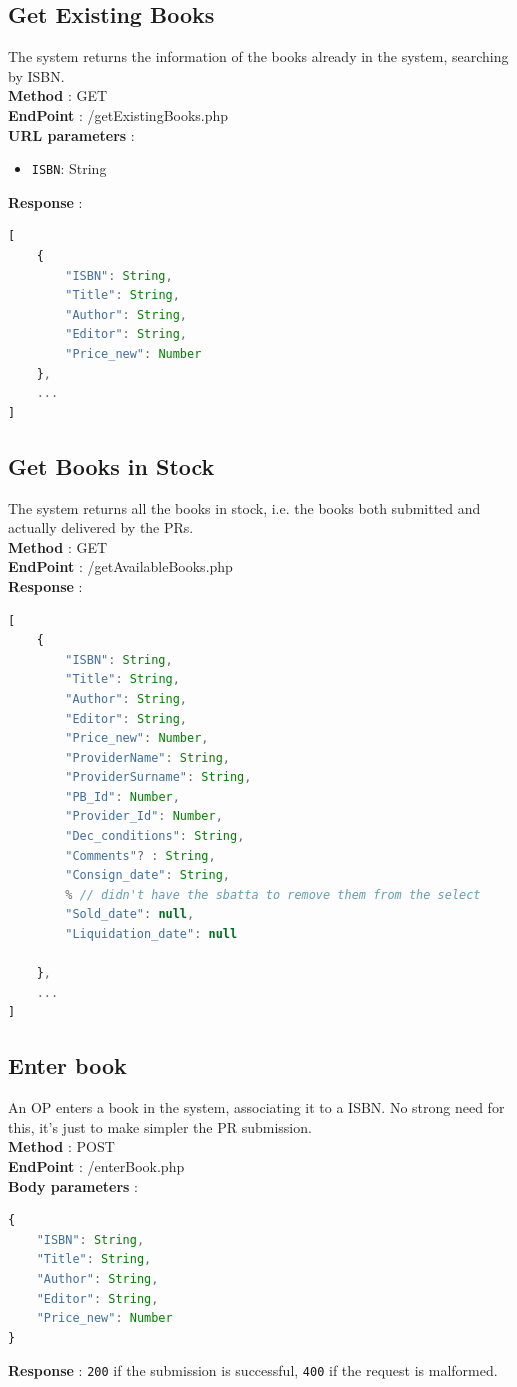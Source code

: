 \subsection{Get Existing Books}
The system returns the information of the books already in the system, searching by ISBN.\\
\textbf{Method} : GET \\
\textbf{EndPoint} : /getExistingBooks.php \\
\textbf{URL parameters} :
\begin{itemize}
    \item \texttt{ISBN}: String
\end{itemize}
\textbf{Response} :
\begin{lstlisting}[language=JavaScript, label={lst:jscode}, basicstyle=\ttfamily]
[
    {
        "ISBN": String,
        "Title": String,
        "Author": String,
        "Editor": String,
        "Price_new": Number
    },
    ...
]
\end{lstlisting}

\subsection{Get Books in Stock}
The system returns all the books in stock, i.e. the books both submitted and actually delivered by the PRs.\\
\textbf{Method} : GET \\
\textbf{EndPoint} : /getAvailableBooks.php \\
\textbf{Response} :
\begin{lstlisting}[language=JavaScript, label={lst:jscode}, basicstyle=\ttfamily]
[
    {
        "ISBN": String,
        "Title": String,
        "Author": String,
        "Editor": String,
        "Price_new": Number,
        "ProviderName": String,
        "ProviderSurname": String,
        "PB_Id": Number,
        "Provider_Id": Number,
        "Dec_conditions": String,
        "Comments"? : String,
        "Consign_date": String,
        % // didn't have the sbatta to remove them from the select
        "Sold_date": null, 
        "Liquidation_date": null

    },
    ...
]
\end{lstlisting}

\subsection{Enter book}
An OP enters a book in the system, associating it to a ISBN. No strong need for this, it's just to make simpler the PR submission.\\
\textbf{Method} : POST \\
\textbf{EndPoint} : /enterBook.php \\
\textbf{Body parameters} :
\begin{lstlisting}[language=JavaScript, label={lst:jscode}, basicstyle=\ttfamily]
{
    "ISBN": String,
    "Title": String,
    "Author": String,
    "Editor": String,
    "Price_new": Number
}
\end{lstlisting}
\textbf{Response} : \texttt{200} if the submission is successful, \texttt{400} if the request is malformed.

